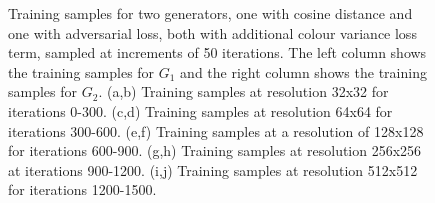 \begin{figure}[!htbp]
    \hfill
    \hfill
    \hfill
    \hfill
    \hfill
    \caption[Training samples for two generators, one with cosine distance and one with adversarial loss, both with additional colour variance loss term]{Training samples for two generators, one with cosine distance and one with adversarial loss, both with additional colour variance loss term, sampled at increments of 50 iterations. The left column shows the training samples for $G_{1}$ and the right column shows the training samples for $G_{2}$. (a,b) Training samples at resolution 32x32 for iterations 0-300. (c,d) Training samples at resolution 64x64 for iterations 300-600. (e,f) Training samples at a resolution of 128x128 for iterations 600-900. (g,h) Training samples at resolution 256x256 at iterations 900-1200. (i,j) Training samples at resolution 512x512 for iterations 1200-1500.}
    \label{fig:c3:samples-cosine-adv}
  \end{figure}

